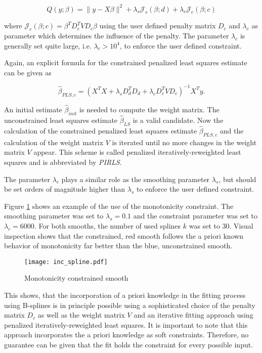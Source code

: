 \begin{equation} \label{PLSc}
 Q(y; \beta) = \lVert y - X\beta \rVert^2 + \lambda_s \mathcal J_s(\beta; d) + \lambda_c \mathcal J_c(\beta; c)
\end{equation}

where $\mathcal J_c(\beta; c) = \beta^T D_c^T V D_c \beta$ using the user defined penalty matrix $D_c$ and $\lambda_c$ as parameter which determines the influence of the penalty. The parameter $\lambda_c$ is generally set quite large, i.e. $\lambda_c > 10^4$, to enforce the user defined constraint. 
	
Again, an explicit formula for the constrained penalized least squares estimate can be given as

$$\hat \beta_{PLS,c} = (X^TX + \lambda_s D_d^T D_d  + \lambda_c D_c^T V D_c)^{-1} X^T y.$$

An initial estimate $\hat \beta_{init}$ is needed to compute the weight matrix. The unconstrained least squares estimate $\hat \beta_{LS}$ is a valid candidate. Now the calculation of the constrained penalized least squares estimate $\hat \beta_{PLS, c}$ and the calculation of the weight matrix $V$ is iterated until no more changes in the weight matrix $V$ appear. This scheme is called penalized iteratively-reweighted least squares and is abbreviated by \emph{PIRLS}. \cite{hofner2011monotonicity}

The parameter $\lambda_c$ plays a similar role as the smoothing parameter $\lambda_s$, but should be set orders of magnitude higher than $\lambda_s$ to enforce the user defined constraint. 

Figure \ref{fig:incspline} shows an example of the use of the monotonicity constraint. The smoothing parameter was set to $\lambda_s = 0.1$ and the constraint parameter was set to $\lambda_c = 6000$. For both smooths, the number of used splines $k$ was set to $30$. Visual inspection shows that the constrained, red smooth follows the a priori known behavior of monotonicity far better than the blue, unconstrained smooth.


\begin{figure}[H]
\centering
\texttt{[image: inc\_spline.pdf]}
\caption{Monotonicity constrained smooth}
\label{fig:incspline}
\end{figure}		

This shows, that the incorporation of a priori knowledge in the fitting process using B-splines is in principle possible using a sophisticated choice of the penalty matrix $D_c$ as well as the weight matrix $V$ and an iterative fitting approach using penalized iteratively-reweighted least squares. It is important to note that this approach incorporates the a priori knowledge as soft constraints. Therefore, no guarantee can be given that the fit holds the constraint for every possible input. 

